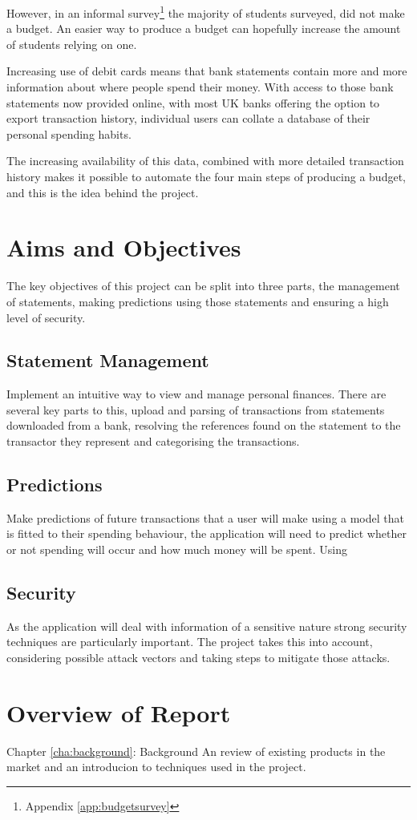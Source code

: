 However, in an informal survey\footnote{Appendix \ref{app:budgetsurvey}} the majority of students surveyed, did not make a budget. An easier way to produce a budget can hopefully increase the amount of students relying on one.

Increasing use of debit cards\cite{bbc2010debit} means that bank statements contain more and more information about where people spend their money. With access to those bank statements now provided online, with most UK banks offering the option to export \gls{transaction} history, individual users can collate a database of their personal spending habits.

The increasing availability of this data, combined with more detailed transaction history makes it possible to automate the four main steps of producing a budget, and this is the idea behind the project.

\section{Aims and Objectives}

The key objectives of this project can be split into three parts, the management of statements, making predictions using those statements and ensuring a high level of security.

\subsection{Statement Management}
Implement an intuitive way to view and manage personal finances.
There are several key parts to this, upload and parsing of transactions from statements downloaded from a bank, resolving the references found on the statement to the transactor they represent and categorising the transactions.
    
\subsection{Predictions}
Make predictions of future transactions that a user will make using a model that is fitted to their spending behaviour, the application will need to predict whether or not spending will occur and how much money will be spent.
Using

\subsection{Security}
As the application will deal with information of a sensitive nature strong security techniques are particularly important.
The project takes this into account, considering possible attack vectors and taking steps to mitigate those attacks.

\section{Overview of Report}

Chapter \ref{cha:background}: Background 
An review of existing products in the market and an introducion to techniques used in the project.